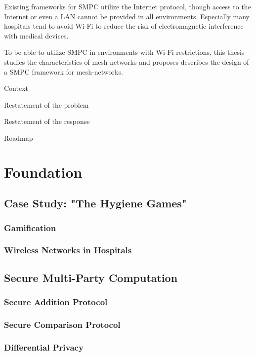 Existing frameworks for \gls{SMPC} utilize the Internet protocol, though access to the Internet or even a \gls{LAN} cannot be provided in all environments. Especially many hospitals tend to avoid Wi-Fi to reduce the risk of electromagnetic interference with medical devices.

To be able to utilize \gls{SMPC} in environments with Wi-Fi restrictions, this thesis studies the characteristics of mesh-networks and proposes describes the design of a \gls{SMPC} framework for mesh-networks. 

Context

Restatement of the problem

Restatement of the response

Roadmap

\chapter{Foundation}

	\section{Case Study: "The Hygiene Games"}

		\subsection*{Gamification}

		\subsection*{Wireless Networks in Hospitals}
	
	\section{Secure Multi-Party Computation}

		\subsection*{Secure Addition Protocol}

		\subsection*{Secure Comparison Protocol}

		\subsection*{Differential Privacy}

